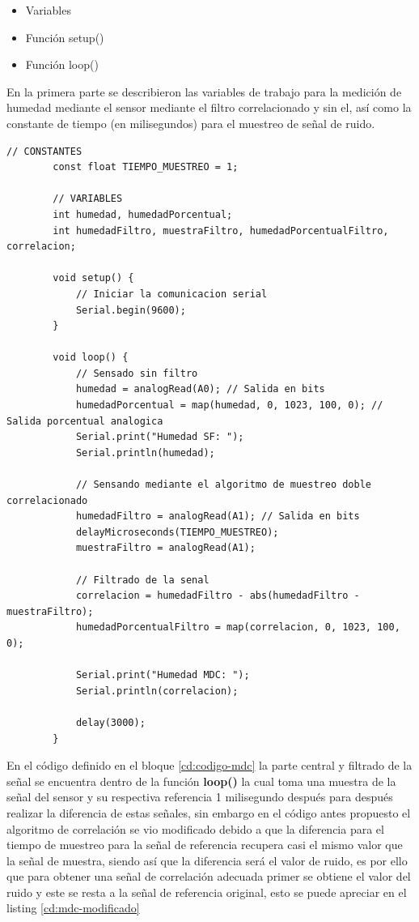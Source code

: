 \documentclass[conference]{IEEEtran}
\begin{document}
	\begin{itemize}
		\item Variables
		\item Función setup()
		\item Función loop()
	\end{itemize}
	
	En la primera parte se describieron las variables de trabajo para la medición de humedad mediante el sensor mediante el filtro correlacionado y sin el, así como la constante de tiempo (en milisegundos) para el muestreo de señal de ruido.
	
	\begin{lstlisting}[caption=Arduino Muestreo doble Correlacionado, numbers=none, label=cd:codigo-mdc]
		// CONSTANTES
		const float TIEMPO_MUESTREO = 1;
		
		// VARIABLES
		int humedad, humedadPorcentual;
		int humedadFiltro, muestraFiltro, humedadPorcentualFiltro, correlacion;
		
		void setup() {
			// Iniciar la comunicacion serial
			Serial.begin(9600);
		}
		
		void loop() {
			// Sensado sin filtro
			humedad = analogRead(A0); // Salida en bits
			humedadPorcentual = map(humedad, 0, 1023, 100, 0); // Salida porcentual analogica
			Serial.print("Humedad SF: ");
			Serial.println(humedad);
			
			// Sensando mediante el algoritmo de muestreo doble correlacionado
			humedadFiltro = analogRead(A1); // Salida en bits
			delayMicroseconds(TIEMPO_MUESTREO);
			muestraFiltro = analogRead(A1);
			
			// Filtrado de la senal
			correlacion = humedadFiltro - abs(humedadFiltro - muestraFiltro);
			humedadPorcentualFiltro = map(correlacion, 0, 1023, 100, 0);
			
			Serial.print("Humedad MDC: ");
			Serial.println(correlacion);
			
			delay(3000);
		}
	\end{lstlisting}
	 
	En el código definido en el bloque \ref{cd:codigo-mdc} la parte central y filtrado de la señal se encuentra dentro de la función \textbf{loop()} la cual toma una muestra de la señal del sensor y su respectiva referencia 1 milisegundo después para después realizar la diferencia de estas señales, sin embargo en el código antes propuesto el algoritmo de correlación  se vio modificado debido a que la diferencia para el tiempo de muestreo para la señal de referencia recupera casi el mismo valor que la señal de muestra, siendo así que la diferencia será el valor de ruido, es por ello que para obtener una señal de correlación adecuada primer se obtiene el valor del ruido y este se resta a la señal de referencia original, esto se puede apreciar en el listing \ref{cd:mdc-modificado}
	
\end{document}
